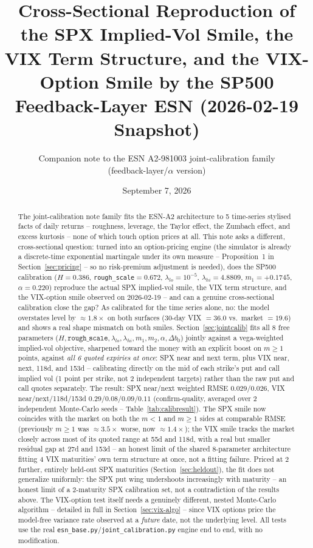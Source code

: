 \documentclass[11pt]{article}
\title{Cross-Sectional Reproduction of the SPX Implied-Vol Smile, the\\
VIX Term Structure, and the VIX-Option Smile by the SP500\\
Feedback-Layer ESN (2026-02-19 Snapshot)}
\author{Companion note to the ESN A2-981003 joint-calibration family\\
(feedback-layer/$\alpha$ version)}
\date{September 7, 2026}
\begin{document}
\maketitle

\begin{abstract}
The joint-calibration note family fits the ESN-A2 architecture to 5
time-series stylised facts of daily returns -- roughness, leverage,
the Taylor effect, the Zumbach effect, and excess kurtosis -- none of
which touch option prices at all. This note asks a different,
cross-sectional question: turned into an option-pricing engine (the
simulator is already a discrete-time exponential martingale under its
own measure -- Proposition~1 in Section~\ref{sec:pricing} -- so no
risk-premium adjustment is needed), does the SP500 calibration
($H=0.386$, \texttt{rough\_scale}$=0.672$, $\lambda_{lo}=10^{-5}$,
$\lambda_{hi}=4.8809$, $m_1=+0.1745$, $\alpha=0.220$) reproduce the
actual SPX implied-vol smile, the VIX term structure, and the
VIX-option smile observed on 2026-02-19 -- and can a genuine
cross-sectional calibration close the gap? As calibrated for the
time series alone, no: the model overstates level by $\approx1.8\times$
on both surfaces (30-day VIX $=36.0$ vs.\ market $=19.6$) and shows a
real shape mismatch on both smiles. Section~\ref{sec:jointcalib} fits
all 8 free parameters ($H,\texttt{rough\_scale},\lambda_{lo},\lambda_{hi},
m_1,m_2,\alpha,\Delta b_0$) jointly against a vega-weighted implied-vol
objective, sharpened toward the money with an explicit boost on
$m\ge1$ points, against \emph{all 6 quoted expiries at once}: SPX near
and next term, plus VIX near, next, 118d, and 153d -- calibrating
directly on the mid of each strike's put and call implied vol (1
point per strike, not 2 independent targets) rather than the raw put
and call quotes separately. The result: SPX near/next weighted RMSE
$0.029$/$0.026$, VIX near/next/118d/153d $0.29$/$0.08$/$0.09$/$0.11$
(confirm-quality, averaged over 2 independent Monte-Carlo seeds --
Table~\ref{tab:calibresult}). The SPX smile now coincides with the
market on both the $m<1$ and $m\ge1$ sides at comparable RMSE
(previously $m\ge1$ was $\approx3.5\times$ worse, now $\approx1.4\times$);
the VIX smile tracks the market closely across most of its quoted
range at 55d and 118d, with a real but smaller residual gap at 27d
and 153d -- an honest limit of the shared 8-parameter architecture
fitting 4 VIX maturities' own term structure at once, not a
fitting failure. Priced at 2 further, entirely held-out SPX
maturities (Section~\ref{sec:heldout}), the fit does not generalize
uniformly: the SPX put wing undershoots increasingly with maturity --
an honest limit of a 2-maturity SPX calibration set, not a
contradiction of the results above. The VIX-option test itself needs
a genuinely different, nested Monte-Carlo algorithm -- detailed in
full in Section~\ref{sec:vix-algo} -- since VIX options price the
model-free variance rate observed at a \emph{future} date, not the
underlying level. All tests use the real
\texttt{esn\_base.py}/\texttt{joint\_calibration.py} engine end to
end, with no modification.
\end{abstract}
\end{document}
